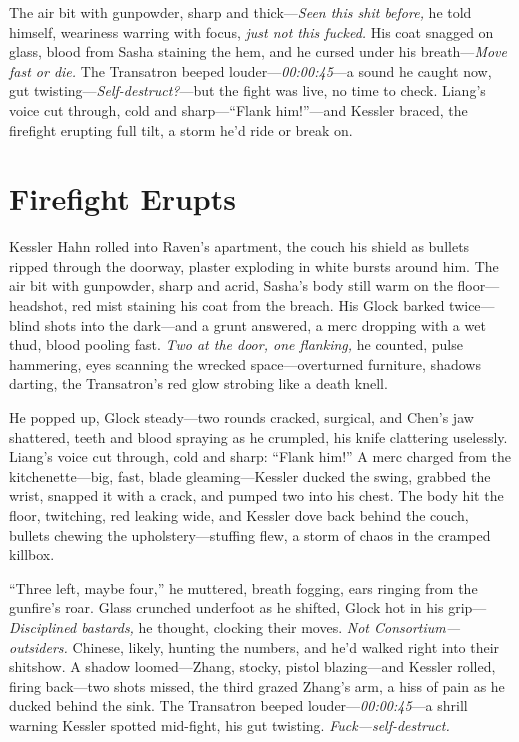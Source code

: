\documentclass[12pt]{book}
\begin{document}
The air bit with gunpowder, sharp and thick—\textit{Seen this shit before,} he told himself, weariness warring with focus, \textit{just not this fucked.} His coat snagged on glass, blood from Sasha staining the hem, and he cursed under his breath—\textit{Move fast or die.} The Transatron beeped louder—\textit{00:00:45}—a sound he caught now, gut twisting—\textit{Self-destruct?}—but the fight was live, no time to check. Liang’s voice cut through, cold and sharp—“Flank him!”—and Kessler braced, the firefight erupting full tilt, a storm he’d ride or break on.

\section{Firefight Erupts}

Kessler Hahn rolled into Raven’s apartment, the couch his shield as bullets ripped through the doorway, plaster exploding in white bursts around him. The air bit with gunpowder, sharp and acrid, Sasha’s body still warm on the floor—headshot, red mist staining his coat from the breach. His Glock barked twice—blind shots into the dark—and a grunt answered, a merc dropping with a wet thud, blood pooling fast. \textit{Two at the door, one flanking,} he counted, pulse hammering, eyes scanning the wrecked space—overturned furniture, shadows darting, the Transatron’s red glow strobing like a death knell.

He popped up, Glock steady—two rounds cracked, surgical, and Chen’s jaw shattered, teeth and blood spraying as he crumpled, his knife clattering uselessly. Liang’s voice cut through, cold and sharp: “Flank him!” A merc charged from the kitchenette—big, fast, blade gleaming—Kessler ducked the swing, grabbed the wrist, snapped it with a crack, and pumped two into his chest. The body hit the floor, twitching, red leaking wide, and Kessler dove back behind the couch, bullets chewing the upholstery—stuffing flew, a storm of chaos in the cramped killbox.

“Three left, maybe four,” he muttered, breath fogging, ears ringing from the gunfire’s roar. Glass crunched underfoot as he shifted, Glock hot in his grip—\textit{Disciplined bastards,} he thought, clocking their moves. \textit{Not Consortium—outsiders.} Chinese, likely, hunting the numbers, and he’d walked right into their shitshow. A shadow loomed—Zhang, stocky, pistol blazing—and Kessler rolled, firing back—two shots missed, the third grazed Zhang’s arm, a hiss of pain as he ducked behind the sink. The Transatron beeped louder—\textit{00:00:45}—a shrill warning Kessler spotted mid-fight, his gut twisting. \textit{Fuck—self-destruct.}
\end{document}
